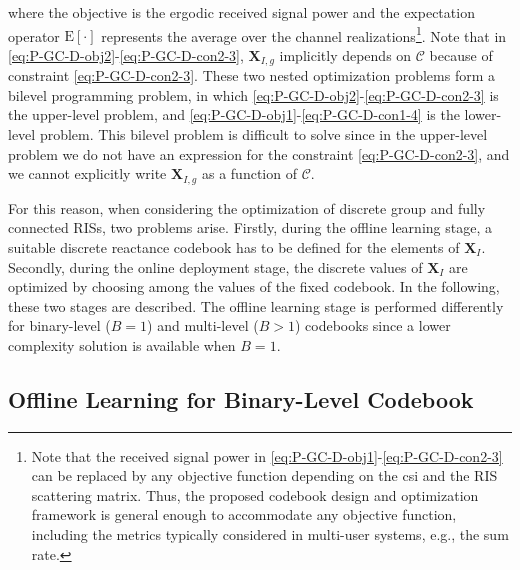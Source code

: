 \documentclass[twocolumn,10pt]{IEEEtran}
\begin{document}
where the objective is the ergodic received signal power and the expectation operator $\mathrm{E}[\cdot]$ represents the average over the channel realizations\footnote{Note that the received signal power in \eqref{eq:P-GC-D-obj1}-\eqref{eq:P-GC-D-con2-3} can be replaced by any objective function depending on the \gls{csi} and the RIS scattering matrix.
Thus, the proposed codebook design and optimization framework is general enough to accommodate any objective function, including the metrics typically considered in multi-user systems, e.g., the sum rate.}.
Note that in \eqref{eq:P-GC-D-obj2}-\eqref{eq:P-GC-D-con2-3}, $\mathbf{X}_{I,g}$ implicitly depends on $\mathcal{C}$ because of constraint \eqref{eq:P-GC-D-con2-3}.
These two nested optimization problems form a bilevel programming problem, in which \eqref{eq:P-GC-D-obj2}-\eqref{eq:P-GC-D-con2-3} is the upper-level problem, and \eqref{eq:P-GC-D-obj1}-\eqref{eq:P-GC-D-con1-4} is the lower-level problem.
This bilevel problem is difficult to solve since in the upper-level problem we do not have an expression for the constraint \eqref{eq:P-GC-D-con2-3}, and we cannot explicitly write $\mathbf{X}_{I,g}$ as a function of $\mathcal{C}$.

For this reason, when considering the optimization of discrete group and fully connected RISs, two problems arise.
Firstly, during the offline learning stage, a suitable discrete reactance codebook has to be defined for the elements of $\mathbf{X}_{I}$.
Secondly, during the online deployment stage, the discrete values of $\mathbf{X}_{I}$ are optimized by choosing among the values of the fixed codebook.
In the following, these two stages are described.
The offline learning stage is performed differently for binary-level ($B=1$) and multi-level ($B>1$) codebooks since a lower complexity solution is available when $B=1$.

\subsection{Offline Learning for Binary-Level Codebook}
\label{sec:scalar-discrete-binary}
\end{document}
